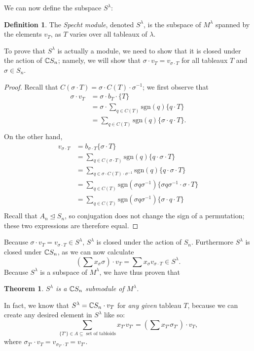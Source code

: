 \documentclass[12pt,twoside]{reedthesis}
\theoremstyle{plain}   %
\newtheorem{thm}{Theorem}[section] %
\theoremstyle{definition}
\newtheorem{defn}{Definition}[section]
\theoremstyle{remark}
\numberwithin{equation}{section}
\def\normeq{\trianglelefteq}
\def\sgn{\mathrm{sgn}}
\begin{document}
  We can now define the subspace $S^\lambda$:
  \begin{defn}
    The \emph{Specht module}, denoted \emph{$S^\lambda$}, is the subspace of $M^\lambda$ spanned by the elements $v_T$, as $T$ varies over all tableaux of
    $\lambda$.
  \end{defn}
  To prove that $S^\lambda$ is actually a module, we need to show that it is closed under the action of $\mathbb{C} S_n$; namely,
  we will show that $\sigma \cdot v_T = v_{\sigma \cdot T}$ for all tableaux $T$ and $\sigma \in S_n$.
  \begin{proof}
    Recall that $C(\sigma \cdot T) = \sigma \cdot C(T) \cdot \sigma^{-1}$; we first observe that
    \begin{align*}
      \sigma \cdot v_{T} &= \sigma \cdot b_T \cdot \{ T\} \\
                         &= \sigma \cdot \sum_{ q \in C(T)} \sgn(q) \{q \cdot T\} \\
                         &= \sum_{ q \in C(T)} \sgn(q) \{\sigma \cdot q \cdot T\}. \\
    \end{align*}
    On the other hand,
    \begin{align*}
      v_{\sigma \cdot T} &= b_{\sigma \cdot T} \{ \sigma \cdot T\} \\
                         &= \sum_{q \in C(\sigma \cdot T)} \sgn(q) \{q \cdot \sigma \cdot T\}\\
                         &= \sum_{q \in \sigma \cdot C(T) \cdot \sigma^{-1}} \sgn(q) \{q \cdot \sigma \cdot T\}\\
                         &= \sum_{q \in C(T)} \sgn(\sigma q \sigma^{-1}) \{\sigma q \sigma^{-1} \cdot \sigma \cdot T\}\\
                         &= \sum_{q \in C(T)} \sgn(\sigma q \sigma^{-1}) \{\sigma \cdot q \cdot T\}\\      
    \end{align*}
    Recall that $A_n \normeq S_n$, so conjugation does not change the sign of a permutation; these two expressions are therefore equal.
  \end{proof}

  Because $\sigma \cdot v_T = v_{\sigma \cdot T} \in S^\lambda$, $S^\lambda$ is closed under the action of $S_n$. Furthermore $S^\lambda$ is closed under $\mathbb{C}  S_n$, as we can
  now calculate
  \[(\sum x_\sigma \sigma) \cdot v_T = \sum x_\sigma v_{\sigma \cdot T} \in S^\lambda.\]
  Because $S^\lambda$ is a subspace of $M^\lambda$, we have thus proven that
  \begin{thm}
    $S^\lambda$ is a $\mathbb{C} S_n$ submodule of $M^\lambda$.
  \end{thm}
  In fact, we know that $S^\lambda = \mathbb{C} S_n \cdot v_T$ for \emph{any given} tableau $T$,
  because we can create any desired element in $S^\lambda$ like so:
  \[\sum_{\{T'\} \in A \subseteq \text{ set of tabloids}} x_{T'} v_{T'} = (\sum x_{T'} \sigma_{T'}) \cdot v_T,\]
  where $\sigma_{T'} \cdot v_T = v_{\sigma_{T'} \cdot T} = v_{T'}$.
\end{document}
